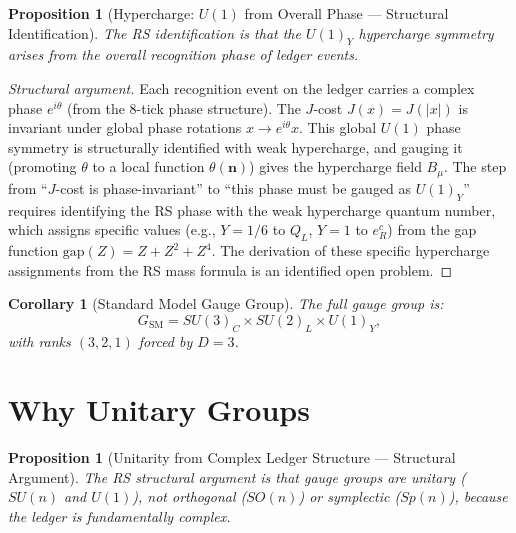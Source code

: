 \documentclass[12pt,a4paper]{article}
\newtheorem{corollary}[theorem]{Corollary}
\newtheorem{proposition}[theorem]{Proposition}
\theoremstyle{definition}
\theoremstyle{remark}
\begin{document}
\begin{proposition}[Hypercharge: $U(1)$ from Overall Phase --- Structural Identification]
\label{thm:u1}
The RS identification is that the $U(1)_Y$ hypercharge symmetry arises from the
overall recognition phase of ledger events.
\end{proposition}

\begin{proof}[Structural argument]
Each recognition event on the ledger carries a complex phase
$e^{i\theta}$ (from the 8-tick phase structure).  The $J$-cost
$J(x) = J(|x|)$ is invariant under global phase rotations
$x \to e^{i\theta} x$.  This global $U(1)$ phase symmetry is
structurally identified with weak hypercharge, and gauging it
(promoting $\theta$ to a local function $\theta(\mathbf{n})$) gives
the hypercharge field $B_\mu$.  The step from ``$J$-cost is phase-invariant''
to ``this phase must be gauged as $U(1)_Y$'' requires identifying the
RS phase with the weak hypercharge quantum number, which assigns
specific values (e.g., $Y = 1/6$ to $Q_L$, $Y = 1$ to $e_R^c$) from
the gap function $\mathrm{gap}(Z) = Z + Z^2 + Z^4$.  The derivation of
these specific hypercharge assignments from the RS mass formula is an
identified open problem.
\end{proof}

\begin{corollary}[Standard Model Gauge Group]
\label{cor:sm}
The full gauge group is:
\begin{equation}
  G_{\mathrm{SM}} = SU(3)_C \times SU(2)_L \times U(1)_Y,
\end{equation}
with ranks $(3, 2, 1)$ forced by $D = 3$.
\end{corollary}

\section{Why Unitary Groups}
\label{sec:unitary}

\begin{proposition}[Unitarity from Complex Ledger Structure --- Structural Argument]
\label{thm:unitary}
The RS structural argument is that gauge groups are unitary ($SU(n)$ and $U(1)$),
not orthogonal ($SO(n)$) or symplectic ($Sp(n)$), because the
ledger is fundamentally complex.
\end{proposition}
\end{document}
